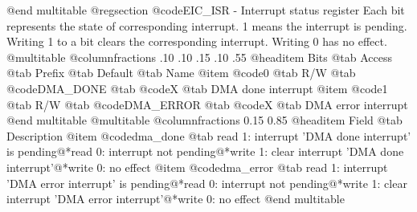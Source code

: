 @end multitable
@regsection @code{EIC_ISR} - Interrupt status register
Each bit represents the state of corresponding interrupt. 1 means the interrupt is pending. Writing 1 to a bit clears the corresponding interrupt. Writing 0 has no effect.
@multitable @columnfractions .10 .10 .15 .10 .55
@headitem Bits @tab Access @tab Prefix @tab Default @tab Name
@item @code{0}
@tab R/W @tab
@code{DMA_DONE}
@tab @code{X} @tab 
DMA done interrupt
@item @code{1}
@tab R/W @tab
@code{DMA_ERROR}
@tab @code{X} @tab 
DMA error interrupt
@end multitable
@multitable @columnfractions 0.15 0.85
@headitem Field @tab Description
@item @code{dma_done} @tab read 1: interrupt 'DMA done interrupt' is pending@*read 0: interrupt not pending@*write 1: clear interrupt 'DMA done interrupt'@*write 0: no effect
@item @code{dma_error} @tab read 1: interrupt 'DMA error interrupt' is pending@*read 0: interrupt not pending@*write 1: clear interrupt 'DMA error interrupt'@*write 0: no effect
@end multitable
